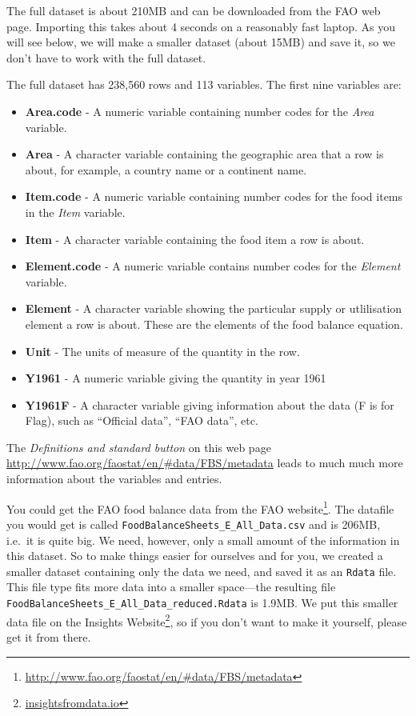 \documentclass[]{book}
\providecommand{\tightlist}{%
  \setlength{\itemsep}{0pt}\setlength{\parskip}{0pt}}
\renewcommand{\href}[2]{#2\footnote{\url{#1}}}
\begin{document}
The full dataset is about 210MB and can be downloaded from the FAO web page. Importing this takes about 4 seconds on a reasonably fast laptop. As you will see below, we will make a smaller dataset (about 15MB) and save it, so we don't have to work with the full dataset.

The full dataset has 238,560 rows and 113 variables. The first nine variables are:

\begin{itemize}
\tightlist
\item
  \textbf{Area.code} - A numeric variable containing number codes for the \emph{Area} variable.
\item
  \textbf{Area} - A character variable containing the geographic area that a row is about, for example, a country name or a continent name.
\item
  \textbf{Item.code} - A numeric variable containing number codes for the food items in the \emph{Item} variable.
\item
  \textbf{Item} - A character variable containing the food item a row is about.
\item
  \textbf{Element.code} - A numeric variable contains number codes for the \emph{Element} variable.
\item
  \textbf{Element} - A character variable showing the particular supply or utlilisation element a row is about. These are the elements of the food balance equation.
\item
  \textbf{Unit} - The units of measure of the quantity in the row.
\item
  \textbf{Y1961} - A numeric variable giving the quantity in year 1961
\item
  \textbf{Y1961F} - A character variable giving information about the data (F is for Flag), such as ``Official data'', ``FAO data'', etc.
\end{itemize}

The \emph{Definitions and standard button} on this web page \url{http://www.fao.org/faostat/en/\#data/FBS/metadata} leads to much much more information about the variables and entries.

You could get the FAO food balance data from the \href{http://www.fao.org/faostat/en/\#data/FBS/metadata}{FAO website}. The datafile you would get is called \texttt{FoodBalanceSheets\_E\_All\_Data.csv} and is 206MB, i.e.~it is quite big. We need, however, only a small amount of the information in this dataset. So to make things easier for ourselves and for you, we created a smaller dataset containing only the data we need, and saved it as an \texttt{Rdata} file. This file type fits more data into a smaller space---the resulting file \texttt{FoodBalanceSheets\_E\_All\_Data\_reduced.Rdata} is 1.9MB. We put this smaller data file on the \href{insightsfromdata.io}{Insights Website}, so if you don't want to make it yourself, please get it from there.
\end{document}
